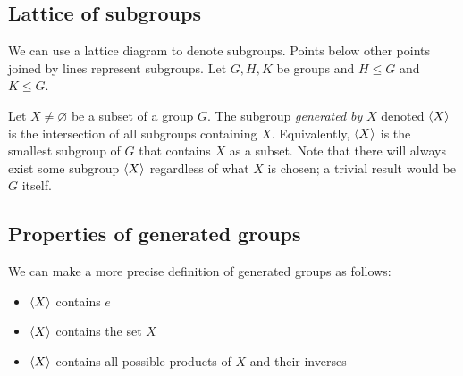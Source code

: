 \subsection{Lattice of subgroups}
We can use a lattice diagram to denote subgroups.
Points below other points joined by lines represent subgroups.
Let \(G, H, K\) be groups and \(H \leq G\) and \(K \leq G\).


\begin{definition}
	Let \(X \neq \varnothing\) be a subset of a group \(G\).
	The subgroup \textit{generated by} \(X\) denoted \(\langle{} X \rangle\) is the intersection of all subgroups containing \(X\).
	Equivalently, \(\langle{} X \rangle\) is the smallest subgroup of \(G\) that contains \(X\) as a subset.
	Note that there will always exist some subgroup \(\langle{} X \rangle\) regardless of what \(X\) is chosen; a trivial result would be \(G\) itself.
\end{definition}

\subsection{Properties of generated groups}
We can make a more precise definition of generated groups as follows:
\begin{itemize}
	\item \(\langle{} X \rangle\) contains \(e\)
	\item \(\langle{} X \rangle\) contains the set \(X\)
	\item \(\langle{} X \rangle\) contains all possible products of \(X\) and their inverses
\end{itemize}

